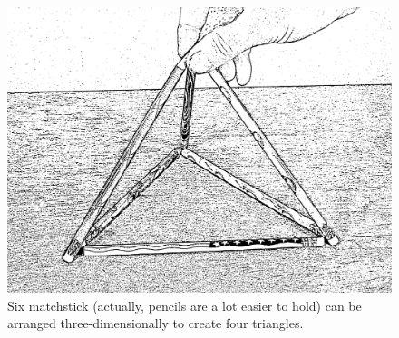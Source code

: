 \begin{figure}[!hbtp] 
\begin{center}
\includegraphics[scale=1]{photos/pencil_tetrahedron.jpg}
\end{center}
\caption[Four triangles bounded by 6 line segments]{Six matchstick (actually, pencils are a lot easier to hold) can be arranged three-dimensionally to create
four triangles.}
\label{fig:4triangles}
\end{figure}
 
\vfill

\rule{0pt}{0pt}

\clearpage





